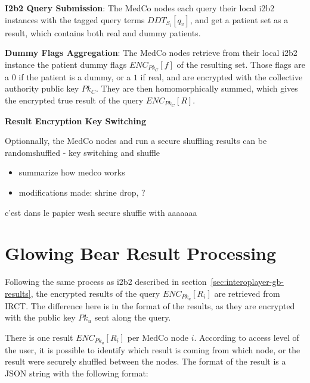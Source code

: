 \item \textbf{I2b2 Query Submission}:
The MedCo nodes each query their local i2b2 instances with the tagged query terms $DDT_{S_i}[q_v]$, and get a patient set as a result, which contains both real and dummy patients.

\item \textbf{Dummy Flags Aggregation}:
The MedCo nodes retrieve from their local i2b2 instance the patient dummy flags $ENC_{Pk_C}[f]$ of the resulting set.
Those flags are a $0$ if the patient is a dummy, or a $1$ if real, and are encrypted with the collective authority public key $Pk_C$.
They are then homomorphically summed, which gives the encrypted true result of the query $ENC_{Pk_C}[R]$.

\item \textbf{Result Encryption Key Switching}

Optionnally, the MedCo nodes and run a secure shuffling results can be randomshuffled 
- key switching and shuffle


\begin{itemize}
    \item summarize how medco works
    \item modifications made: shrine drop, ?
\end{itemize}

c'est dans le papier wesh
secure shuffle with aaaaaaa





\section{Glowing Bear Result Processing}

Following the same process as i2b2 described in section~\ref{sec:interoplayer-gb-results}, the encrypted results of the query $ENC_{Pk_u}[R_i]$ are retrieved from IRCT.
The difference here is in the format of the results, as they are encrypted with the public key $Pk_u$ sent along the query.

There is one result $ENC_{Pk_u}[R_i]$ per MedCo node $i$.
According to access level of the user, it is possible to identify which result is coming from which node, or the result were securely shuffled between the nodes.
The format of the result is a JSON string with the following format:

